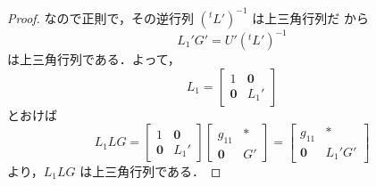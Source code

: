 \documentclass[11pt, uplatex, dvipdfmx]{jsarticle}
\theoremstyle{definition}
\begin{document}
\begin{proof}
  なので正則で，その逆行列 $\left({}^{t}L'\right)^{-1}$ は上三角行列だ
  から
  \[
    L_1' G' = U'\left( {}^{t}L'\right)^{-1}
  \]
  は上三角行列である．よって，
  \[
    L_1 = \left[
      \begin{array}{cc}
        1 & \bm{0}\\
        \bm{0} & L_1'
      \end{array}
    \right]
  \]
  とおけば
  \[
    L_1 L G = \left[
      \begin{array}{cc}
        1 & \bm{0}\\
        \bm{0} & L_1'
      \end{array}
    \right] \left[
      \begin{array}{cc}
        g_{11} & \bm{\ast} \\
        \bm{0} & G'
      \end{array}
    \right] = \left[
      \begin{array}{cc}
        g_{11} & \bm{\ast}\\
        \bm{0} & L_1' G'
      \end{array}
    \right]
  \]
  より，$L_1 L G$ は上三角行列である．
\end{proof}

\newpage
\end{document}
